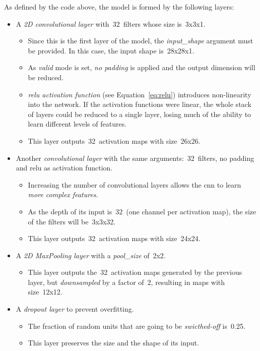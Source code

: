As defined by the code above, the model is formed by the following layers:
\begin{itemize}
	\item A \emph{2D convolutional layer} with~32~filters whose size is~3x3x1.
	\begin{itemize}
		\item Since this is the first layer of the model, the \emph{\textit{input\_shape}} argument must be provided. In this case, the input shape is~28x28x1. 
		\item As \textit{valid} mode is set, \emph{no padding} is applied and the output dimension will be reduced. 
		\item \emph{\gls{relu} activation function} (see Equation~\ref{eq:relu}) introduces non-linearity into the network. If the activation functions were linear, the whole stack of layers could be reduced to a single layer, losing much of the ability to learn different levels of features.
		\item This layer outputs~32~activation maps with size~26x26.
	\end{itemize}
	
	\item Another \emph{convolutional layer} with the same arguments:~32~filters, no padding and \gls{relu} as activation function.
	\begin{itemize}
		\item Increasing the number of convolutional layers allows the \gls{cnn} to learn \emph{more complex features}. 
		\item As the depth of its input is~32~(one channel per activation map), the size of the filters will be~3x3x32. 
		\item This layer outputs~32~activation maps with size~24x24.
	\end{itemize}
	
	\item A \emph{2D MaxPooling layer} with a \textit{pool\_size} of~2x2.
	\begin{itemize}
		\item This layer outputs the~32~activation maps generated by the previous layer, but \emph{\textit{downsampled}} by a factor of~2, resulting in maps with size~12x12.
	\end{itemize}
	
	\item A \emph{dropout layer} to prevent overfitting. 
	\begin{itemize}
		\item The fraction of random units that are going to be \emph{\textit{swicthed-off}} is~0.25.
		\item This layer preserves the size and the shape of its input.
	\end{itemize} 
	

\end{itemize}
